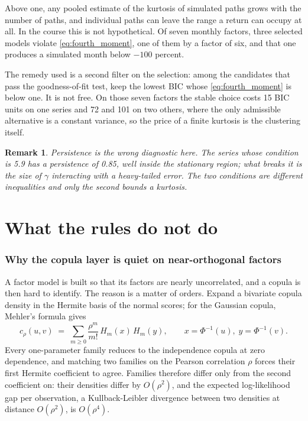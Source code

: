\documentclass[11pt]{article}
\newtheorem{remark}{Remark}
\begin{document}
Above one, any pooled estimate of the kurtosis of simulated paths grows with
the number of paths, and individual paths can leave the range a return can
occupy at all. In the course this is not hypothetical. Of seven monthly
factors, three selected models violate \eqref{eq:fourth_moment}, one of them
by a factor of six, and that one produces a simulated month below
$-100$ percent.

The remedy used is a second filter on the selection: among the candidates that
pass the goodness-of-fit test, keep the lowest BIC whose
\eqref{eq:fourth_moment} is below one. It is not free. On those seven factors
the stable choice costs 15 BIC units on one series and 72 and 101 on two
others, where the only admissible alternative is a constant variance, so the
price of a finite kurtosis is the clustering itself.

\begin{remark}
Persistence is the wrong diagnostic here. The series whose condition is 5.9
has a persistence of 0.85, well inside the stationary region; what breaks it
is the size of $\gamma$ interacting with a heavy-tailed error. The two
conditions are different inequalities and only the second bounds a kurtosis.
\end{remark}

\part{What the rules do not do}

\section{Why the copula layer is quiet on near-orthogonal factors}\label{sec:identify}

A factor model is built so that its factors are nearly uncorrelated, and a
copula is then hard to identify. The reason is a matter of orders. Expand a
bivariate copula density in the Hermite basis of the normal scores; for the
Gaussian copula, Mehler's formula gives
\begin{equation}\label{eq:mehler}
  c_\rho(u,v) \;=\; \sum_{m \ge 0} \frac{\rho^m}{m!}\, H_m(x)\,H_m(y),
  \qquad x = \Phi^{-1}(u),\; y = \Phi^{-1}(v).
\end{equation}
Every one-parameter family reduces to the independence copula at zero
dependence, and matching two families on the Pearson correlation $\rho$ forces
their first Hermite coefficient to agree. Families therefore differ only from
the second coefficient on: their densities differ by $O(\rho^2)$, and the
expected log-likelihood gap per observation, a Kullback-Leibler divergence
between two densities at distance $O(\rho^2)$, is $O(\rho^4)$.
\end{document}
